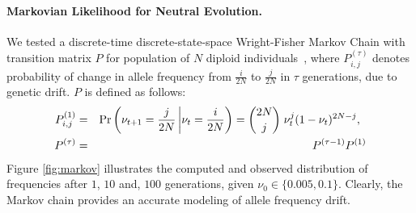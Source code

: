 \documentclass[11pt]{article}
\begin{document}
\paragraph{Markovian Likelihood for Neutral Evolution.}
We tested a discrete-time discrete-state-space Wright-Fisher Markov
Chain with transition matrix $P$ for population of $N$ diploid
individuals~\cite{Ewens2012Mathematical}, where $P^{(\tau)}_{i,j}$
denotes probability of change in allele frequency from $\frac{i}{2N}$
to $\frac{j}{2N}$ in $\tau$ generations, due to genetic drift. $P$ is
defined as follows:
\begin{eqnarray}
  P^{(1)}_{i,j} &=& \operatorname{Pr}\left(\nu_{t+1}=\frac{j}{2N} \left|
      \nu_{t}=\frac{i}{2N}\right)={2N \choose j} \right.  \nu_{t}^j
  (1-\nu_{t})^{2N-j}, \;\;\\
  P^{(\tau)} &=&   P^{(\tau-1)}P^{(1)}\\
\end{eqnarray}
Figure \ref{fig:markov} illustrates the computed and observed
distribution of frequencies after $1$, $10$ and, $100$ generations,
given $\nu_0\in\{0.005,0.1\}$. Clearly, the Markov chain provides an
accurate modeling of allele frequency drift.
\end{document}
